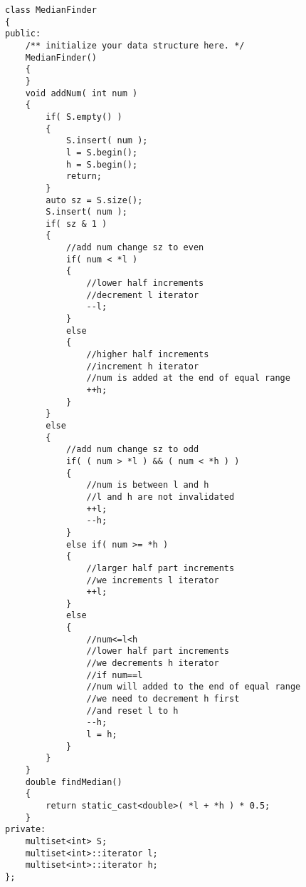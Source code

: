 \begin{lstlisting}[style=customc, caption={Multiset And Two Pointers}]
class MedianFinder
{
public:
    /** initialize your data structure here. */
    MedianFinder()
    {
    }
    void addNum( int num )
    {
        if( S.empty() )
        {
            S.insert( num );
            l = S.begin();
            h = S.begin();
            return;
        }
        auto sz = S.size();
        S.insert( num );
        if( sz & 1 )
        {
            //add num change sz to even
            if( num < *l )
            {
                //lower half increments
                //decrement l iterator
                --l;
            }
            else
            {
                //higher half increments
                //increment h iterator
                //num is added at the end of equal range
                ++h;
            }
        }
        else
        {
            //add num change sz to odd
            if( ( num > *l ) && ( num < *h ) )
            {
                //num is between l and h
                //l and h are not invalidated
                ++l;
                --h;
            }
            else if( num >= *h )
            {
                //larger half part increments
                //we increments l iterator
                ++l;
            }
            else
            {
                //num<=l<h
                //lower half part increments
                //we decrements h iterator
                //if num==l
                //num will added to the end of equal range
                //we need to decrement h first
                //and reset l to h
                --h;
                l = h;
            }
        }
    }
    double findMedian()
    {
        return static_cast<double>( *l + *h ) * 0.5;
    }
private:
    multiset<int> S;
    multiset<int>::iterator l;
    multiset<int>::iterator h;
};
\end{lstlisting}
